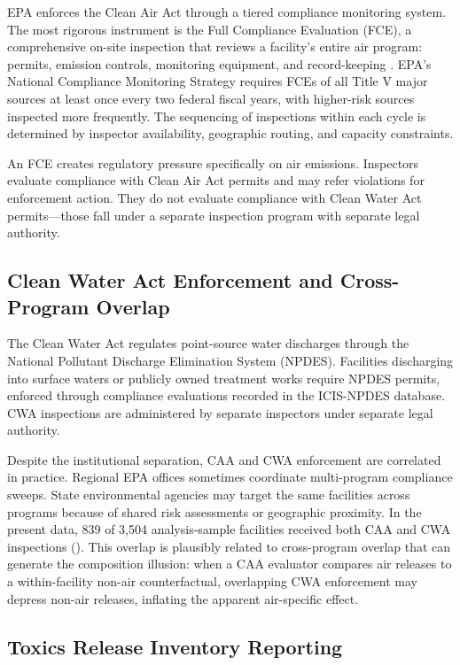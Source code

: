 \documentclass[12pt]{article}
\begin{document}
EPA enforces the Clean Air Act through a tiered compliance monitoring system. The most rigorous instrument is the Full Compliance Evaluation (FCE), a comprehensive on-site inspection that reviews a facility's entire air program: permits, emission controls, monitoring equipment, and record-keeping \citep{epa2014cms}. EPA's National Compliance Monitoring Strategy requires FCEs of all Title V major sources at least once every two federal fiscal years, with higher-risk sources inspected more frequently. The sequencing of inspections within each cycle is determined by inspector availability, geographic routing, and capacity constraints.

An FCE creates regulatory pressure specifically on air emissions. Inspectors evaluate compliance with Clean Air Act permits and may refer violations for enforcement action. They do not evaluate compliance with Clean Water Act permits---those fall under a separate inspection program with separate legal authority.

\subsection{Clean Water Act Enforcement and Cross-Program Overlap}

The Clean Water Act regulates point-source water discharges through the National Pollutant Discharge Elimination System (NPDES). Facilities discharging into surface waters or publicly owned treatment works require NPDES permits, enforced through compliance evaluations recorded in the ICIS-NPDES database. CWA inspections are administered by separate inspectors under separate legal authority.

Despite the institutional separation, CAA and CWA enforcement are correlated in practice. Regional EPA offices sometimes coordinate multi-program compliance sweeps. State environmental agencies may target the same facilities across programs because of shared risk assessments or geographic proximity. In the present data, 839 of 3,504 analysis-sample facilities received both CAA and CWA inspections (). This overlap is plausibly related to cross-program overlap that can generate the composition illusion: when a CAA evaluator compares air releases to a within-facility non-air counterfactual, overlapping CWA enforcement may depress non-air releases, inflating the apparent air-specific effect.

\subsection{Toxics Release Inventory Reporting}
\end{document}
